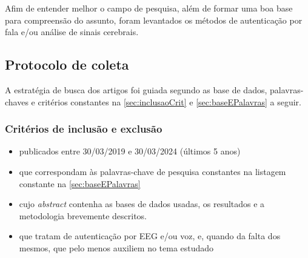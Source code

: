 		\par Afim de entender melhor o campo de pesquisa, além de formar uma boa base para compreensão do assunto, foram levantados os métodos de autenticação por fala e/ou análise de sinais cerebrais.
		
		\subsection{Protocolo de coleta}
		
			\par A estratégia de busca dos artigos foi guiada segundo as base de dados, palavras-chaves e critérios constantes na \autoref{sec:inclusaoCrit} e \autoref{sec:baseEPalavras} a seguir.
		
			\subsubsection{Critérios de inclusão e exclusão}
			\label{sec:inclusaoCrit}
			\begin{itemize}
				\item publicados entre 30/03/2019 e 30/03/2024 (últimos 5 anos)
				\item que correspondam às palavras-chave de pesquisa constantes na listagem constante na \autoref{sec:baseEPalavras}
				\item cujo \textit{abstract} contenha as bases de dados usadas, os resultados e a metodologia brevemente descritos.
				\item que tratam de autenticação por EEG e/ou voz, e, quando da falta dos mesmos, que pelo menos auxiliem no tema estudado
			\end{itemize}
			
			

